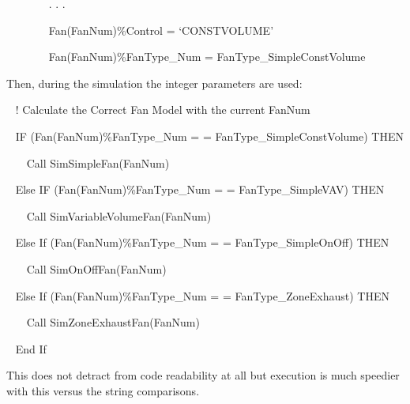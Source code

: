~~~~~~~ . . .

~~~~~~~ Fan(FanNum)\%Control = `CONSTVOLUME'

~~~~~~~ Fan(FanNum)\%FanType\_Num = FanType\_SimpleConstVolume

Then, during the simulation the integer parameters are used:

~ ! Calculate the Correct Fan Model with the current FanNum

~ IF (Fan(FanNum)\%FanType\_Num = = FanType\_SimpleConstVolume) THEN

~~~ Call SimSimpleFan(FanNum)

~ Else IF (Fan(FanNum)\%FanType\_Num = = FanType\_SimpleVAV) THEN

~~~ Call SimVariableVolumeFan(FanNum)

~ Else If (Fan(FanNum)\%FanType\_Num = = FanType\_SimpleOnOff) THEN

~~~ Call SimOnOffFan(FanNum)

~ Else If (Fan(FanNum)\%FanType\_Num = = FanType\_ZoneExhaust) THEN

~~~ Call SimZoneExhaustFan(FanNum)

~ End If

This does not detract from code readability at all but execution is much speedier with this versus the string comparisons.
